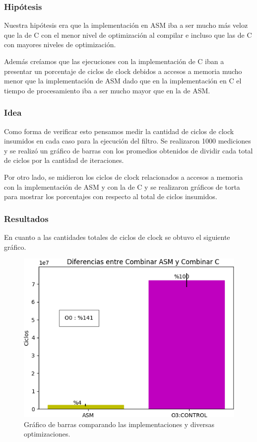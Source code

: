 \subsubsection{Hipótesis}
\par{Nuestra hipótesis era que la implementación en ASM iba a ser mucho más veloz que la de C con el menor nivel de optimización al compilar e incluso que las de C con mayores niveles de optimización.}
\par{Además creíamos que las ejecuciones con la implementación de C iban a presentar un porcentaje de ciclos de clock debidos a accesos a memoria mucho menor que la implementación de ASM dado que en la implementación en C el tiempo de procesamiento iba a ser mucho mayor que en la de ASM.}

\subsubsection{Idea}
\par{Como forma de verificar esto pensamos medir la cantidad de ciclos de clock insumidos en cada caso para la ejecución del filtro. Se realizaron 1000 mediciones y se realizó un gráfico de barras con los promedios obtenidos de dividir cada total de ciclos por la cantidad de iteraciones.}
\par{Por otro lado, se midieron los ciclos de clock relacionados a accesos a memoria con la implementación de ASM y con la de C y se realizaron gráficos de torta para mostrar los porcentajes con respecto al total de ciclos insumidos.}

\subsubsection{Resultados}
\par{En cuanto a las cantidades totales de ciclos de clock se obtuvo el siguiente gráfico.}

\begin{figure}[h!]
\centering
\captionsetup{justification=centering}
	\includegraphics[width = 10 cm, height = 7 cm]{imagenes/CombinarASMvsC.png}
	\caption[center]{Gráfico de barras comparando las implementaciones y diversas optimizaciones.}
\end{figure}

